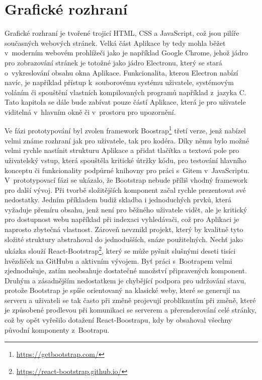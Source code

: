 \chapter{Grafické rozhraní}

Grafické rozhraní je tvořené trojicí HTML, CSS a JavaScript, což jsou pilíře současných webových stránek. Velká část Aplikace by tedy mohla běžet v~moderním webovém prohlížeči jako je například Google Chrome, jehož jádro pro zobrazování stránek je totožné jako jádro Electronu, který se stará o~vykreslování obsahu okna Aplikace. Funkcionalita, kterou Electron nabízí navíc, je například přístup k~souborovému systému uživatele, systémovým voláním či spouštění vlastních kompilovaných programů například z~jazyka C. Tato kapitola se dále bude zabívat pouze částí Aplikace, která je pro uživatele viditelná v~hlavním okně či v~prostoru pro upozornění.

Ve fázi prototypování byl zvolen framework Boostrap\footnote{\url{https://getbootstrap.com/}} třetí verze, jenž nabízel velmi známe rozhraní jak pro uživatele, tak pro kodéra. Díky němu bylo možné velmi rychle nastínit strukturu Aplikace a přidat tlačítka a textová pole pro uživatelský vstup, která spouštěla kritické útržky kódu, pro testování hlavního konceptu či funkcionality podpůrné knihovny pro práci s~Gitem v~JavaScriptu. V~prototypovací fázi se ukázalo, že Bootstrap nebude příliš vhodný framework pro další vývoj. Při tvorbě složitějších komponent začal rychle prezentovat své nedostatky. Jedním příkladem budiž skladba i jednoduchých prvků, která vyžaduje přemíru obsahu, jenž není pro běžného uživatele vidět, ale je kritický pro dostupnost webu například při indexaci vyhledávači, což pro Aplikaci je naprosto zbytečná vlastnost. Zároveň nevznikl projekt, který by kvalitně tyto složité struktury abstrahoval do jednodušších, snáze použitelných. Nechť jako ukázka slouží React-Bootstrap\footnote{\url{https://react-bootstrap.github.io/}}, který se může pyšnit slušnými deseti tisíci hvězdiček na GitHubu a aktivním vývojem. Byť práci s~Bootrapem velmi zjednodušuje, zatím neobsahuje dostatečné množství připravených komponent. Druhým a zásadnějším nedostatkem je chybějící podpora pro udržování stavu, protože Bootstrap je spíše orientovaný na klasické weby, které se generují na serveru a uživateli se tak často při změně projevují probliknutím při změně, které je způsobené prodlevou při komunikaci se serverem a přerenderování celé stránky, což by opět vyřešilo dotažení React-Boostrapu, kdy by obsahoval všechny původní komponenty z~Bootrapu.

